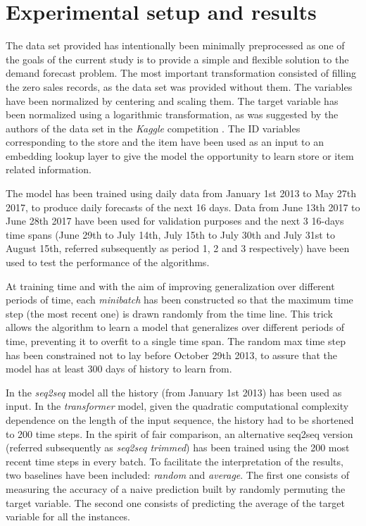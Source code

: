 \documentclass{elsarticle}
\begin{document}
    
	\section{Experimental setup and results}
	The data set provided has intentionally been minimally preprocessed as one of the goals of the current study is to provide a simple and flexible solution to the demand forecast problem. The most important transformation consisted of filling the zero sales records, as the data set was provided without them. The variables have been normalized by centering and scaling them. The target variable has been normalized using a logarithmic transformation, as was suggested by the authors of the data set in the \textit{Kaggle} competition \cite{corporacionfavoritadataset2018}. The ID variables corresponding to the store and the item have been used as an input to an embedding lookup layer to give the model the opportunity to learn store or item related information.
	
	The model has been trained using daily data from January 1st 2013 to May 27th 2017, to produce daily forecasts of the next 16 days. Data from  June 13th 2017 to June 28th 2017 have been used for validation purposes and the next 3 16-days time spans (June 29th to July 14th, July 15th to July 30th and July 31st to August 15th, referred subsequently as period 1, 2 and 3 respectively) have been used to test the performance of the algorithms.
	
	At training time and with the aim of improving generalization over different periods of time, each \textit{minibatch} has been constructed so that the maximum time step (the most recent one)  is drawn randomly from the time line. This trick allows the algorithm to learn a model that generalizes over different periods of time, preventing it to overfit to a single time span. The random max time step has been constrained not to lay before October 29th 2013, to assure that the model has at least 300 days of history to learn from. 
	
	In the \textit{seq2seq} model all the history (from January 1st 2013) has been used as input.  In the \textit{transformer} model, given the quadratic computational complexity dependence on the length of the input sequence, the history had to be shortened to 200 time steps. In the spirit of fair comparison, an alternative seq2seq version (referred subsequently as \textit{seq2seq trimmed}) has been trained using the 200 most recent time steps in every batch. To facilitate the interpretation of the results, two baselines have been included: \textit{random} and \textit{average}. The first one consists of measuring the accuracy of a naive prediction built by randomly permuting the target variable. The second one consists of predicting the average of the target variable for all the instances. 
	
\end{document}

